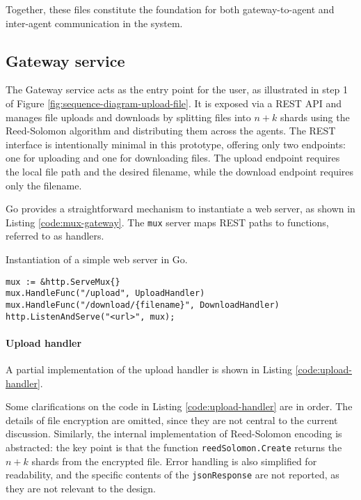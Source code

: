 Together, these files constitute the foundation for both gateway-to-agent and inter-agent communication in the system.

\subsection{Gateway service} 

The Gateway service acts as the entry point for the user, as illustrated in step 1 of Figure \ref{fig:sequence-diagram-upload-file}. It is exposed via a REST API and manages file uploads and downloads by splitting files into $n+k$ shards using the Reed-Solomon algorithm and distributing them across the agents. The REST interface is intentionally minimal in this prototype, offering only two endpoints: one for uploading and one for downloading files. The upload endpoint requires the local file path and the desired filename, while the download endpoint requires only the filename.

Go provides a straightforward mechanism to instantiate a web server, as shown in Listing \ref{code:mux-gateway}. The \texttt{mux} server maps REST paths to functions, referred to as handlers. 

\begin{listing}\caption{Instantiation of a simple web server in Go.}

\label{code:mux-gateway}
\begin{verbatim}
mux := &http.ServeMux{}
mux.HandleFunc("/upload", UploadHandler)
mux.HandleFunc("/download/{filename}", DownloadHandler)
http.ListenAndServe("<url>", mux);
\end{verbatim}
\end{listing}


\paragraph{Upload handler}

A partial implementation of the upload handler is shown in Listing \ref{code:upload-handler}.

Some clarifications on the code in Listing \ref{code:upload-handler} are in order.
The details of file encryption are omitted, since they are not central to the current discussion. Similarly, the internal implementation of Reed-Solomon encoding is abstracted: the key point is that the function \texttt{reedSolomon.Create} returns the $n+k$ shards from the encrypted file. Error handling is also simplified for readability, and the specific contents of the \texttt{jsonResponse} are not reported, as they are not relevant to the design.


